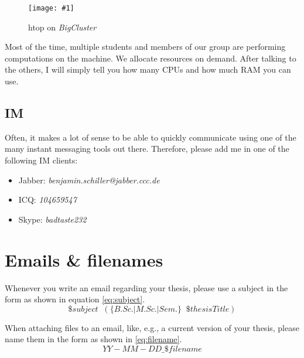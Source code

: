 \documentclass{article}
\newcommand{\img}[4]{
	\begin{figure}[!htb]
		\centering
		\texttt{[image: \#1]}
		\caption{#3}
		\label{#2}
	\end{figure}
}
\begin{document}
\img{bigcluster}{fig:bigcluster}{htop on \emph{BigCluster}}{0.5}

Most of the time, multiple students and members of our group are performing computations on the machine.
We allocate resources on demand.
After talking to the others, I will simply tell you how many CPUs and how much RAM you can use.







\subsection{IM}

Often, it makes a lot of sense to be able to quickly communicate using one of the many instant messaging tools out there.
Therefore, please add me in one of the following IM clients:
\begin{itemize}
	\item Jabber: \emph{benjamin.schiller@jabber.ccc.de}
	\item ICQ: \emph{104659547}
	\item Skype: \emph{badtaste232}
\end{itemize}













\section{Emails \& filenames}

Whenever you write an email regarding your thesis, please use a subject in the form as shown in equation \ref{eq:subject}.
\begin{equation} \label{eq:subject}
	\$subject \;\; (\{B.Sc. | M.Sc. | Sem.\} \;\; \$thesisTitle)
\end{equation}

When attaching files to an email, like, e.g., a current version of your thesis, please name them in the form as shown in \ref{eq:filename}.
\begin{equation} \label{eq:filename}
	YY\!\!-\!\!MM\!\!-\!\!DD\!\_\!\$filename
\end{equation}
\end{document}
